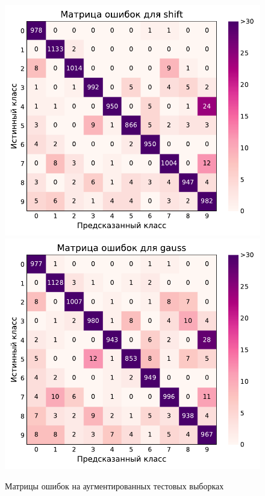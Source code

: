 \documentclass[12pt]{article}
\begin{document}
\begin{figure}[!h]
    \includegraphics[scale=0.6]{6_aug_conf_mat_shift.pdf}
    \includegraphics[scale=0.6]{6_aug_conf_mat_gauss.pdf}
    \caption{Матрицы ошибок на аугментированных тестовых выборках}
    \label{fig:6_aug_conf_mat_1}
\end{figure} 
\end{document}
